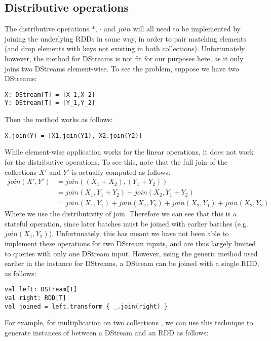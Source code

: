 \subsection{Distributive operations} \label{distoperatorsdstream}
The distributive operations $*$, $\cdot$ and $join$ will all need to be implemented by joining the underlying RDDs in some way, in order to pair matching elements (and drop elements with keys not existing in both collections). Unfortunately however, the  method for DStreams is not fit for our purposes here, as it only joins two DStreams element-wise. To see the problem, suppose we have two DStreams:
\begin{lstlisting}
X: DStream[T] = [X_1,X_2] 
Y: DStream[T] = [Y_1,Y_2]
\end{lstlisting}
Then the  method works as follows:
\begin{lstlisting}
X.join(Y) = [X1.join(Y1), X2.join(Y2)]
\end{lstlisting}
While element-wise application works for the linear operations, it does not work for the distributive operations. To see this, note that the full join of the collections $X'$ and $Y'$ is actually computed as follows:
\begin{equation*}
\begin{split}
join(X',Y') &= join((X_1 + X_2),(Y_1 + Y_2)) \\
&= join(X_1,Y_1 + Y_2) + join(X_2,Y_1 + Y_2) \\
&= join(X_1,Y_1) + join(X_1,Y_2) + join(X_2,Y_1) + join(X_2,Y_2)
\end{split}
\end{equation*}
Where we use the distributivity of join. Therefore we can see that this is a stateful operation, since later batches must be joined with earlier batches (e.g. $join(X_1,Y_2)$). Unfortunately, this has meant we have not been able to implement these operations for two DStream inputs, and are thus largely limited to queries with only one DStream input. However, using the generic  method used earlier in the  instance for DStreams, a DStream can be joined with a single RDD, as follows:
\vs\begin{lstlisting}
val left: DStream[T]
val right: RDD[T]
val joined = left.transform { _.join(right) }
\end{lstlisting}\vs
For example, for multiplication on two collections , we can use this technique to generate instances of  between a DStream and an RDD as follows:
